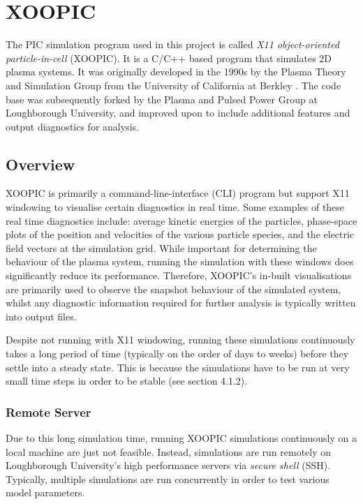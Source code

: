 \chapter{XOOPIC}
\label{ch:xoopic}


The PIC simulation program used in this project is called \textit{X11 object-oriented particle-in-cell} (XOOPIC). It is a C/C++ based program that simulates 2D plasma systems. It was originally developed in the 1990s by the Plasma Theory and Simulation Group from the University of California at Berkley \cite{Verboncoeur1995}. The code base was subsequently forked by the Plasma and Pulsed Power Group at Loughborough University, and improved upon to include additional features and output diagnostics for analysis.


\section{Overview}

XOOPIC is primarily a command-line-interface (CLI) program but support X11 windowing to visualise certain diagnostics in real time. Some examples of these real time diagnostics include: average kinetic energies of the particles, 
phase-space plots of the position and velocities of the various particle species,
and the electric field vectors at the simulation grid. While important for determining the behaviour of the plasma system, running the simulation with these windows does significantly reduce its performance. Therefore, XOOPIC's in-built visualisations are primarily used to observe the snapshot behaviour of the simulated system, whilst any diagnostic information required for further analysis is typically written into output files.

Despite not running with X11 windowing, running these simulations continuously takes a long period of time (typically on the order of days to weeks) before they settle into a steady state. This is because the simulations have to be run at very small time steps in order to be stable (see section 4.1.2). 

\subsection{Remote Server}

Due to this long simulation time, running XOOPIC simulations continuously on a local machine are just not feasible. Instead, simulations are run remotely on Loughborough University's high performance servers via \textit{secure shell} (SSH). Typically, multiple simulations are run concurrently in order to test various model parameters.

